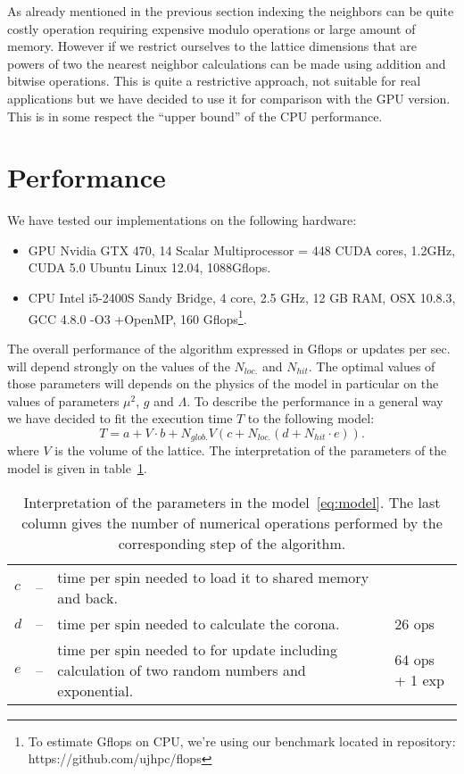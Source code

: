 \documentclass[a4paper]{llncs}
\begin{document}
As already mentioned in the previous section indexing the neighbors
can be quite costly operation requiring expensive modulo
operations or large amount of memory. However if
we restrict ourselves to the lattice dimensions that are powers of two
the nearest neighbor calculations can be made using addition and bitwise
operations. This is quite a restrictive approach, not suitable
for real applications but we have decided to use it for comparison
with the GPU version. This is in some respect the ``upper bound'' of
the CPU performance.


\section{Performance}
\label{sec:performance}

We have tested our implementations on  the following hardware:
\begin{itemize}
\item GPU Nvidia GTX 470, 14 Scalar Multiprocessor = 448 CUDA cores, 1.2GHz, CUDA 5.0 Ubuntu Linux 12.04, 1088Gflops.
\item CPU Intel i5-2400S Sandy Bridge, 4 core, 2.5 GHz, 12 GB RAM, OSX 10.8.3, GCC 4.8.0 -O3 +OpenMP, 160 Gflops\footnote{To estimate Gflops on CPU, we're using our benchmark located in repository: https://github.com/ujhpc/flops}. 
\end{itemize}

The overall performance of the algorithm expressed in Gflops or
updates per sec. will depend strongly on the values of the $N_{loc.}$
and $N_{hit}$. The optimal values of those parameters will depends on
the physics of the model in particular on the values of parameters
$\mu^2$, $g$ and $\Lambda$. To describe the performance in a general
way we have decided to fit the execution time $T$ to the following
model:
\begin{equation}\label{eq:model}
T  = a+ V \cdot b +
N_{glob.} V \left(c + N_{loc.}\left(d + N_{hit}\cdot e\right)\right) . 
\end{equation}
where $V$ is the volume of the lattice.  The interpretation of the
parameters of the model is given in table~\ref{tab:pars-int}.

\begin{table}
\begin{center} \begin{tabular}{lcp{8cm}p{2cm}}
$c$ &--& time per spin needed to load it to shared memory and back.&\\
$d$ &--& time per spin needed to calculate the corona.& 26 ops\\
$e$ &--& time per spin needed to for update including calculation of two
random numbers and exponential. & 64 ops + 1 exp
\end{tabular}
\end{center}
\caption{\label{tab:pars-int}Interpretation of the parameters in the
model~\ref{eq:model}. The last column gives the number of numerical operations
performed by the corresponding step of the algorithm.}
\end{table}
\end{document}
